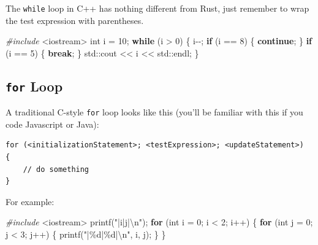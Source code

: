 \documentclass[
]{book}
\newenvironment{Shaded}{\begin{snugshade}}{\end{snugshade}}
\newcommand{\BuiltInTok}[1]{#1}
\newcommand{\ControlFlowTok}[1]{\textcolor[rgb]{0.13,0.29,0.53}{\textbf{#1}}}
\newcommand{\DataTypeTok}[1]{\textcolor[rgb]{0.13,0.29,0.53}{#1}}
\newcommand{\DecValTok}[1]{\textcolor[rgb]{0.00,0.00,0.81}{#1}}
\newcommand{\ImportTok}[1]{#1}
\newcommand{\NormalTok}[1]{#1}
\newcommand{\PreprocessorTok}[1]{\textcolor[rgb]{0.56,0.35,0.01}{\textit{#1}}}
\newcommand{\SpecialCharTok}[1]{\textcolor[rgb]{0.00,0.00,0.00}{#1}}
\newcommand{\StringTok}[1]{\textcolor[rgb]{0.31,0.60,0.02}{#1}}
\begin{document}
The \texttt{while} loop in C++ has nothing different from Rust, just remember to wrap the test expression with parentheses.

\begin{Shaded}
\begin{Highlighting}[]
\PreprocessorTok{\#include }\ImportTok{\textless{}iostream\textgreater{}}
\DataTypeTok{int}\NormalTok{ i = }\DecValTok{10}\NormalTok{;}
\ControlFlowTok{while}\NormalTok{ (i \textgreater{} }\DecValTok{0}\NormalTok{)}
\NormalTok{\{}
\NormalTok{    i{-}{-};}
    \ControlFlowTok{if}\NormalTok{ (i == }\DecValTok{8}\NormalTok{)}
\NormalTok{    \{}
        \ControlFlowTok{continue}\NormalTok{;}
\NormalTok{    \}}
    \ControlFlowTok{if}\NormalTok{ (i == }\DecValTok{5}\NormalTok{)}
\NormalTok{    \{}
        \ControlFlowTok{break}\NormalTok{;}
\NormalTok{    \}}
    \BuiltInTok{std::}\NormalTok{cout \textless{}\textless{} i \textless{}\textless{} }\BuiltInTok{std::}\NormalTok{endl;}
\NormalTok{\}}
\end{Highlighting}
\end{Shaded}

\hypertarget{for-loop}{%
\subsection{\texorpdfstring{\texttt{for} Loop}{for Loop}}\label{for-loop}}

A traditional C-style \texttt{for} loop looks like this (you'll be familiar with this if you code Javascript or Java):

\begin{verbatim}
for (<initializationStatement>; <testExpression>; <updateStatement>)
{
    // do something
}
\end{verbatim}

For example:

\begin{Shaded}
\begin{Highlighting}[]
\PreprocessorTok{\#include }\ImportTok{\textless{}iostream\textgreater{}}
\NormalTok{printf(}\StringTok{"|i|j|}\SpecialCharTok{\textbackslash{}n}\StringTok{"}\NormalTok{);}
\ControlFlowTok{for}\NormalTok{ (}\DataTypeTok{int}\NormalTok{ i = }\DecValTok{0}\NormalTok{; i \textless{} }\DecValTok{2}\NormalTok{; i++)}
\NormalTok{\{}
    \ControlFlowTok{for}\NormalTok{ (}\DataTypeTok{int}\NormalTok{ j = }\DecValTok{0}\NormalTok{; j \textless{} }\DecValTok{3}\NormalTok{; j++)}
\NormalTok{    \{}
\NormalTok{        printf(}\StringTok{"|}\SpecialCharTok{\%d}\StringTok{|}\SpecialCharTok{\%d}\StringTok{|}\SpecialCharTok{\textbackslash{}n}\StringTok{"}\NormalTok{, i, j);}
\NormalTok{    \}}
\NormalTok{\}}
\end{Highlighting}
\end{Shaded}
\end{document}
